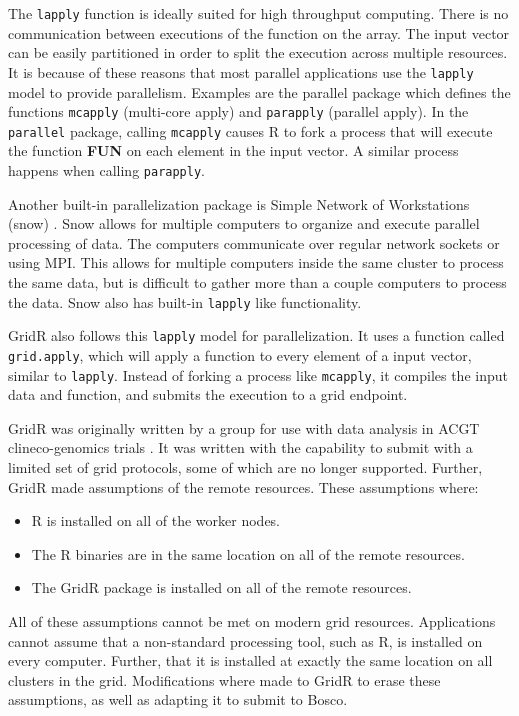\documentclass[conference]{IEEEtran}
\begin{document}
The \texttt{lapply} function is ideally suited for high throughput computing.  There is no communication between executions of the function on the array.  The input vector can be easily partitioned in order to split the execution across multiple resources.  It is because of these reasons that most parallel applications use the \texttt{lapply} model to provide parallelism.  Examples are the parallel package which defines the functions \texttt{mcapply} (multi-core apply) and \texttt{parapply} (parallel apply). In the \texttt{parallel} package, calling \texttt{mcapply} causes R to fork a process that will execute the function \textbf{FUN} on each element in the input vector.  A similar process happens when calling \texttt{parapply}. 

Another built-in parallelization package is Simple Network of Workstations (snow) \cite{rlangsnow}.  Snow allows for multiple computers to organize and execute parallel processing of data.  The computers communicate over regular network sockets or using MPI.  This allows for multiple computers inside the same cluster to process the same data, but is difficult to gather more than a couple computers to process the data.  Snow also has built-in \texttt{lapply} like functionality.

GridR also follows this \texttt{lapply} model for parallelization.  It uses a function called \texttt{grid.apply}, which will apply a function to every element of a input vector, similar to \texttt{lapply}.  Instead of forking a process like \texttt{mcapply}, it compiles the input data and function, and submits the execution to a grid endpoint.

GridR was originally written by a group for use with data analysis in ACGT clineco-genomics trials \cite{wegener2007gridr}.  It was written with the capability to submit with a limited set of grid protocols, some of which are no longer supported.  Further, GridR made assumptions of the remote resources.  These assumptions where:

\begin{itemize}
\item R is installed on all of the worker nodes.
\item The R binaries are in the same location on all of the remote resources.
\item The GridR package is installed on all of the remote resources.
\end{itemize}

All of these assumptions cannot be met on modern grid resources.  Applications cannot assume that a non-standard processing tool, such as R, is installed on every computer.  Further, that it is installed at exactly the same location on all clusters in the grid.  Modifications where made to GridR to erase these assumptions, as well as adapting it to submit to Bosco.
\end{document}
